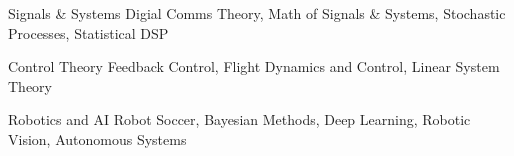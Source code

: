 

\begin{cvskills}

  \cvskill
    {Signals \& Systems} %
    {Digial Comms Theory, Math of Signals \& Systems, Stochastic Processes, Statistical DSP} %

  \cvskill
    {Control Theory} %
    {Feedback Control, Flight Dynamics and Control, Linear System Theory} %

  \cvskill
    {Robotics and AI} %
    {Robot Soccer, Bayesian Methods, Deep Learning, Robotic Vision, Autonomous Systems} %

\end{cvskills}
